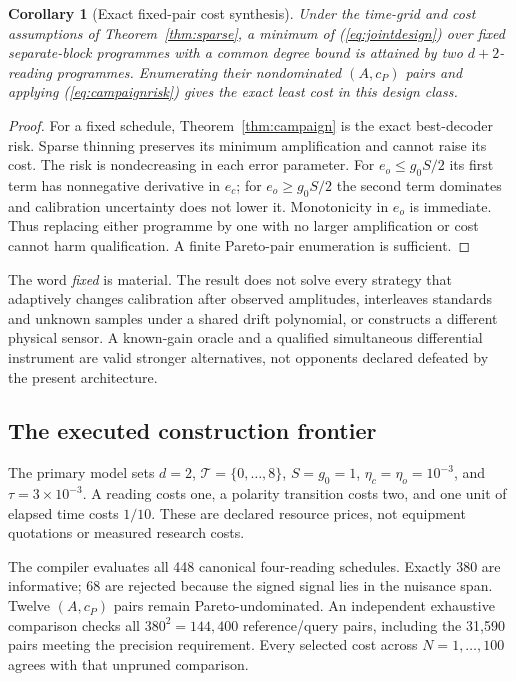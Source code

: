 \documentclass[11pt,letterpaper]{article}
\newtheorem{corollary}[theorem]{Corollary}
\theoremstyle{definition}\newtheorem{definition}[theorem]{Definition}
\theoremstyle{remark}\newtheorem{remark}[theorem]{Remark}
\begin{document}
\begin{corollary}[Exact fixed-pair cost synthesis]
\label{cor:pair}
Under the time-grid and cost assumptions of Theorem~\ref{thm:sparse}, a minimum of (\ref{eq:jointdesign}) over fixed separate-block programmes with a common degree bound is attained by two $d+2$-reading programmes. Enumerating their nondominated $(A,c_P)$ pairs and applying (\ref{eq:campaignrisk}) gives the exact least cost in this design class.
\end{corollary}
\begin{proof}
For a fixed schedule, Theorem~\ref{thm:campaign} is the exact best-decoder risk. Sparse thinning preserves its minimum amplification and cannot raise its cost. The risk is nondecreasing in each error parameter. For $e_o\le g_0S/2$ its first term has nonnegative derivative in $e_c$; for $e_o\ge g_0S/2$ the second term dominates and calibration uncertainty does not lower it. Monotonicity in $e_o$ is immediate. Thus replacing either programme by one with no larger amplification or cost cannot harm qualification. A finite Pareto-pair enumeration is sufficient.
\end{proof}

The word \emph{fixed} is material. The result does not solve every strategy that adaptively changes calibration after observed amplitudes, interleaves standards and unknown samples under a shared drift polynomial, or constructs a different physical sensor. A known-gain oracle and a qualified simultaneous differential instrument are valid stronger alternatives, not opponents declared defeated by the present architecture.

\subsection{The executed construction frontier}
The primary model sets $d=2$, $\mathcal T=\{0,\ldots,8\}$, $S=g_0=1$, $\eta_c=\eta_o=10^{-3}$, and $\tau=3\times10^{-3}$. A reading costs one, a polarity transition costs two, and one unit of elapsed time costs $1/10$. These are declared resource prices, not equipment quotations or measured research costs.

The compiler evaluates all 448 canonical four-reading schedules. Exactly 380 are informative; 68 are rejected because the signed signal lies in the nuisance span. Twelve $(A,c_P)$ pairs remain Pareto-undominated. An independent exhaustive comparison checks all $380^2=144{,}400$ reference/query pairs, including the 31,590 pairs meeting the precision requirement. Every selected cost across $N=1,\ldots,100$ agrees with that unpruned comparison.
\end{document}
